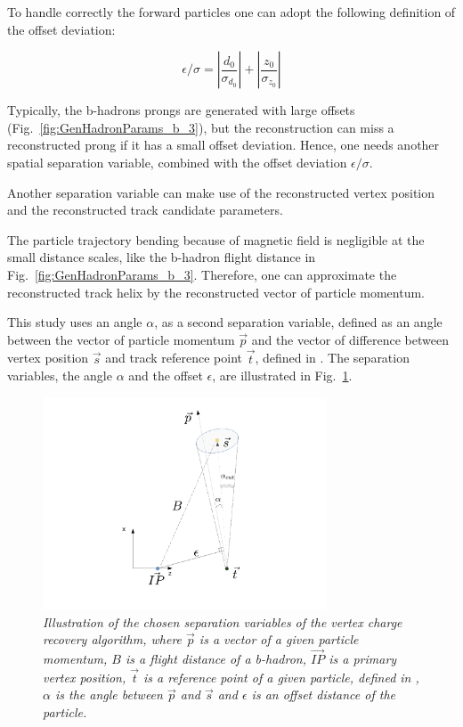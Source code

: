 To handle correctly the forward particles one can adopt the following definition of the offset deviation:

\begin{equation}
	\epsilon/\sigma = |\frac{d_0}{\sigma_{d_0}}| + |\frac{z_0 }{ \sigma_{z_0}}|
\end{equation}

Typically, the b-hadrons prongs are generated with large offsets (Fig.~\ref{fig:GenHadronParams_b_3}), but the reconstruction can miss a reconstructed prong if it has a small offset deviation. 
Hence, one needs another spatial separation variable, combined with the offset deviation $\epsilon/\sigma$. 

Another separation variable can make use of the reconstructed vertex position and the reconstructed track candidate parameters. 

The particle trajectory bending because of magnetic field is negligible at the small distance scales, like the b-hadron flight distance in Fig.~\ref{fig:GenHadronParams_b_3}. 
Therefore, one can approximate the reconstructed track helix by the reconstructed vector of particle momentum. 

This study uses an angle $\alpha$, as a second separation variable, defined as an angle between the vector of particle momentum $\vec{p}$ and the vector of difference between vertex position $\vec{s}$ and track reference point $\vec{t}$, defined in \cite{bib:LCIOtrack}. The separation variables, the angle $\alpha$ and the offset $\epsilon$, are illustrated in Fig.~\ref{fig:VtxRecovery_3}.

\begin{figure}[h]
{\centering
    \includegraphics[width=0.75\textwidth]{ILD/plots/recovery-graph.pdf}
    \caption{\sl Illustration of the chosen separation variables of the vertex charge recovery algorithm, where $\vec{p}$ is a vector of a given particle momentum, $B$ is a flight distance of a b-hadron, $\vec{IP}$ is a primary vertex position, $\vec{t}$ is a reference point of a given particle, defined in \cite{bib:LCIOtrack}, $\alpha$ is the angle between $\vec{p}$ and $\vec{s}$ and $\epsilon$ is an offset distance of the particle. %
    }
    \label{fig:VtxRecovery_3}
  }
\end{figure}

